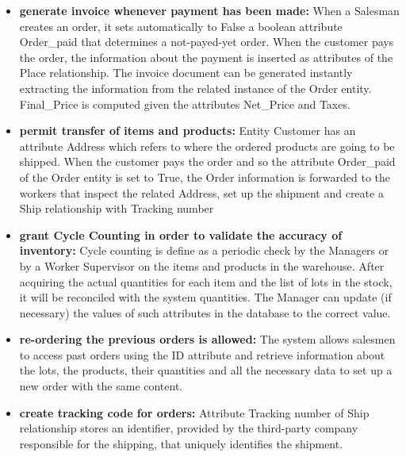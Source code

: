 \begin{itemize}
    \item \textbf{generate invoice whenever payment has been made:} When a Salesman creates an order, it sets automatically to False a boolean attribute Order\_paid that determines a not-payed-yet order. When the customer pays the order, the information about the payment is inserted as attributes of the Place relationship. The invoice document can be generated instantly extracting the information from the related instance of the Order entity. Final\_Price is computed given the attributes Net\_Price and Taxes.
    \item \textbf{permit transfer of items and products:} Entity Customer has an attribute Address which refers to where the ordered products are going to be shipped. When the customer pays the order and so the attribute Order\_paid of the Order entity is set to True, the Order information is forwarded to the workers that inspect the related Address, set up the shipment and create a Ship relationship with Tracking number
    \item \textbf{grant Cycle Counting in order to validate the accuracy of inventory:} Cycle counting is define as a periodic check by the Managers or by a Worker Supervisor on the items and products in the warehouse. After acquiring the actual quantities for each item and the list of lots in the stock, it will be reconciled with the system quantities. The Manager can update (if necessary) the values of such attributes in the database to the correct value.
    \item \textbf{re-ordering the previous orders is allowed:} The system allows salesmen to access past orders using the ID attribute and retrieve information about the lots, the products, their quantities and all the necessary data to set up a new order with the same content.
    \item \textbf{create tracking code for orders:} Attribute Tracking number of Ship relationship stores an identifier, provided by the third-party company responsible for the shipping, that uniquely identifies the shipment.
\end{itemize}








